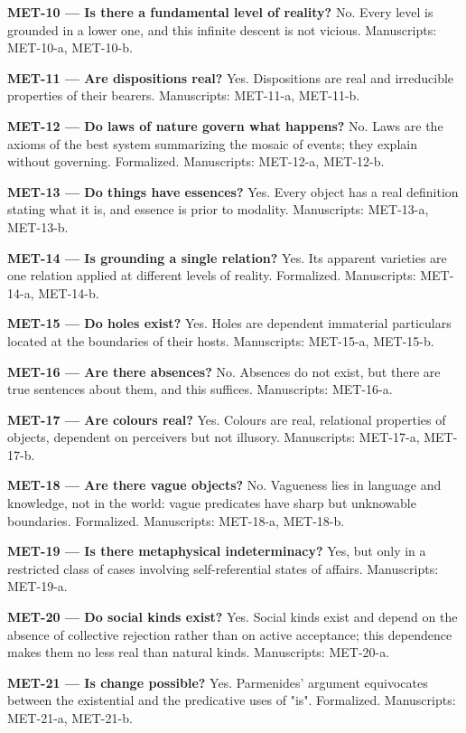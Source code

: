 \documentclass[10pt]{article}
\begin{document}
\textbf{MET-10 --- Is there a fundamental level of reality?} No. Every level is grounded in a lower one, and this infinite descent is not vicious. Manuscripts: MET-10-a, MET-10-b.

\textbf{MET-11 --- Are dispositions real?} Yes. Dispositions are real and irreducible properties of their bearers. Manuscripts: MET-11-a, MET-11-b.

\textbf{MET-12 --- Do laws of nature govern what happens?} No. Laws are the axioms of the best system summarizing the mosaic of events; they explain without governing. Formalized. Manuscripts: MET-12-a, MET-12-b.

\textbf{MET-13 --- Do things have essences?} Yes. Every object has a real definition stating what it is, and essence is prior to modality. Manuscripts: MET-13-a, MET-13-b.

\textbf{MET-14 --- Is grounding a single relation?} Yes. Its apparent varieties are one relation applied at different levels of reality. Formalized. Manuscripts: MET-14-a, MET-14-b.

\textbf{MET-15 --- Do holes exist?} Yes. Holes are dependent immaterial particulars located at the boundaries of their hosts. Manuscripts: MET-15-a, MET-15-b.

\textbf{MET-16 --- Are there absences?} No. Absences do not exist, but there are true sentences about them, and this suffices. Manuscripts: MET-16-a.

\textbf{MET-17 --- Are colours real?} Yes. Colours are real, relational properties of objects, dependent on perceivers but not illusory. Manuscripts: MET-17-a, MET-17-b.

\textbf{MET-18 --- Are there vague objects?} No. Vagueness lies in language and knowledge, not in the world: vague predicates have sharp but unknowable boundaries. Formalized. Manuscripts: MET-18-a, MET-18-b.

\textbf{MET-19 --- Is there metaphysical indeterminacy?} Yes, but only in a restricted class of cases involving self-referential states of affairs. Manuscripts: MET-19-a.

\textbf{MET-20 --- Do social kinds exist?} Yes. Social kinds exist and depend on the absence of collective rejection rather than on active acceptance; this dependence makes them no less real than natural kinds. Manuscripts: MET-20-a.

\textbf{MET-21 --- Is change possible?} Yes. Parmenides' argument equivocates between the existential and the predicative uses of "is". Formalized. Manuscripts: MET-21-a, MET-21-b.
\end{document}
